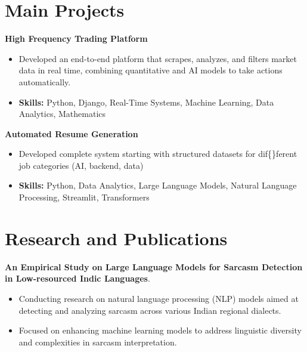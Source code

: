 \documentclass[a4paper,11pt]{article}
\begin{document}
\section{\textbf{Main Projects}}

\vspace{1mm}
  \textbf{High Frequency Trading Platform  }
\vspace{-1.5mm} %
\begin{itemize}
  \item Developed an end-to-end platform that scrapes, analyzes, and filters market data in real time, combining quantitative and AI models to take actions automatically.
\vspace{-3mm}
  \item \textbf{Skills:} Python, Django, Real-Time Systems, Machine Learning, Data Analytics, Mathematics
\end{itemize}


\vspace{1mm}
   \textbf{Automated Resume Generation }
\vspace{-1.5mm} %
\begin{itemize}
  \item Developed complete system starting with structured datasets for dif\{\}ferent job categories (AI, backend, data)
\vspace{-3mm}
  \item \textbf{Skills:} Python, Data Analytics, Large Language Models, Natural Language Processing, Streamlit, Transformers
\end{itemize}



\section{\textbf{Research and Publications} \hfill }
\vspace{1mm}
  \textbf{An Empirical Study on Large Language Models for Sarcasm Detection in Low-resourced Indic Languages}.
\vspace{-1mm} %
\begin{itemize}
  \item Conducting research on natural language processing (NLP) models aimed at detecting and analyzing sarcasm across various Indian regional dialects.
\vspace{-3mm}
  \item Focused on enhancing machine learning models to address linguistic diversity and complexities in sarcasm interpretation.
\end{itemize}
\end{document}
